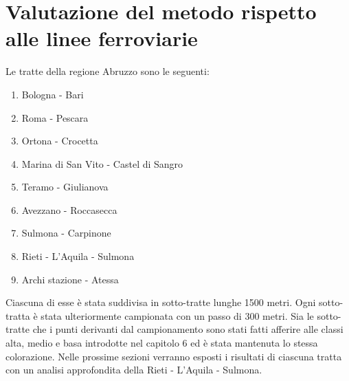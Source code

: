 
\chapter{Valutazione del metodo rispetto alle linee ferroviarie} 
Le tratte della regione Abruzzo sono le seguenti:
\begin{enumerate}
	\item Bologna - Bari
	\item Roma - Pescara
	\item Ortona - Crocetta
	\item Marina di San Vito - Castel di Sangro
	\item Teramo - Giulianova
	\item Avezzano - Roccasecca
	\item Sulmona - Carpinone
	\item Rieti - L'Aquila - Sulmona
	\item Archi stazione - Atessa
\end{enumerate}
Ciascuna di esse è stata suddivisa in sotto-tratte lunghe 1500 metri. Ogni sotto-tratta è stata ulteriormente campionata con un passo di 300 metri. Sia le sotto-tratte che i punti derivanti dal campionamento sono stati fatti afferire alle classi alta, medio e basa introdotte nel capitolo 6 ed è stata mantenuta lo stessa colorazione. Nelle prossime sezioni verranno esposti i risultati di ciascuna tratta con un analisi approfondita della Rieti - L'Aquila - Sulmona.

